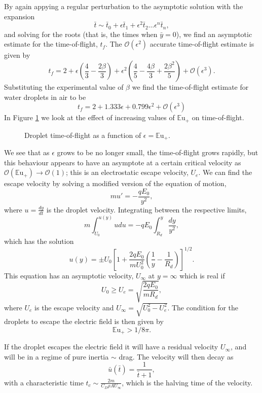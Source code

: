\documentclass[a4paper, 12pt]{article}
\begin{document}
By again appying a regular perturbation to the asymptotic solution with the expansion
\[ \bar{t} \sim \bar{t}_0 + \epsilon \bar{t}_1 + \epsilon^2 \bar{t}_2 \ldots \epsilon^n\bar{t}_n  
,\]
and solving for the roots (that is, the times when $\bar{y} = 0$), we find an asymptotic estimate for the time-of-flight, $t_f$. The $\mathcal{O}(\epsilon^2)$ accurate time-of-flight estimate is given by
\[t_f = 2 + \epsilon \left(\frac{4}{3} - \frac{2 \beta}{3}\right) + \epsilon^{2} \left(\frac{4}{5} - \frac{4 \beta}{3} + \frac{2 \beta^{2}}{5}\right) + \mathcal{O}(\epsilon^3).\]
Substituting the experimental value of $\beta$ we find the time-of-flight estimate for water droplets in air to be
\begin{equation} \label{time_of_flight}
t_f = 2 + 1.333 \epsilon + 0.799 \epsilon^{2} + \mathcal{O}(\epsilon^3) 
\end{equation} 
In Figure \ref{fig:drag} we look at the effect of increasing values of ${\mathbb{E}\mbox{u}}_+$ on time-of-flight.
\begin{figure}[htb]
    \centering
    
    \caption{Droplet time-of-flight as a function of $\epsilon = {\mathbb{E}\mbox{u}}_+$.}
    \label{fig:drag}
\end{figure}

We see that as $\epsilon$ grows to be no longer small, the time-of-flight grows rapidly, but this behaviour appears to have an asymptote at a certain critical velocity as $\mathcal{O}({\mathbb{E}\mbox{u}}_+) \rightarrow \mathcal{O}(1)$; this is an electrostatic escape velocity, $U_e$. We can find the escape velocity by solving a modified version of the equation of motion,
\[ m u' = - \frac{q E_0}{y^2}, \]
where $u = \frac{d y}{d t}$ is the droplet velocity. Integrating between the respective limits,
\[m \int^{u(y)}_{U_0} u du = -q E_0 \int^y_{R_d} \frac{dy}{y^2} ,\]
which has the solution
\[ u(y) = \pm U_0 \left[1 + \frac{2q E_0}{m U_0^2} \left( \frac{1}{y} - \frac{1}{R_d} \right) \right]^{1/2}.
\]
This equation has an asymptotic velocity, $U_{\infty}$ at $y = \infty$ which is real if 
\[ U_0 \geq  U_e = \sqrt{\frac{2 q E_0}{m R_d}},
\]
where $U_e$ is the escape velocity and $U_{\infty} = \sqrt{U_0^2 - U_e^2}$. The condition for the droplets to escape the electric field is then given by
\begin{equation}\label{escape}
{\mathbb{E}\mbox{u}}_+ > 1/8 \pi.
\end{equation}
 
If the droplet escapes the electric field it will have a residual velocity $U_{\infty}$, and will be in a regime of pure inertia $\sim$ drag. The velocity will then decay as
\[
\bar{u}(\bar{t}) = \frac{1}{\bar{t} + 1},
\]
with a characteristic time $t_c \sim \frac{2 m}{C_D \rho A U_{\infty}}$, which is the halving time of the velocity. 

\printbibliography
\end{document}
